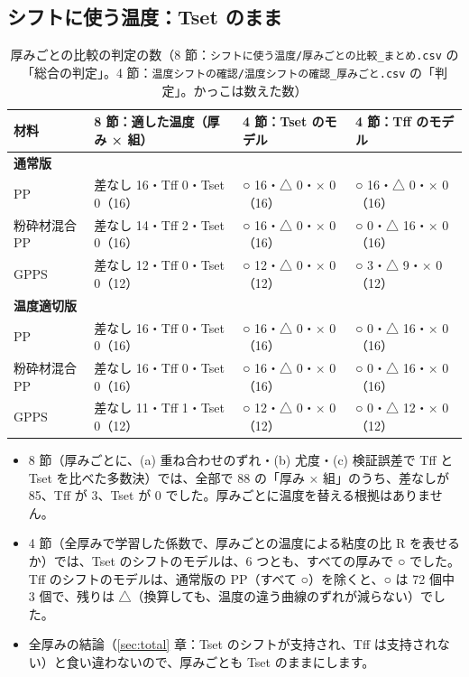 \documentclass[paper=a4paper,fontsize=10.5pt,line_length=44zw,number_of_lines=40]{jlreq}
\let\origtextbf\textbf
\renewcommand{\textbf}[1]{\origtextbf{\gtfamily #1}}   %
\begin{document}
\subsection{シフトに使う温度：Tset のまま}
\begin{table}[H]\centering\small
\caption{厚みごとの比較の判定の数（8 節：\texttt{シフトに使う温度/\allowbreak{}厚みごとの比較\_\allowbreak{}まとめ.csv} の「総合の判定」。4 節：\texttt{温度シフトの確認/\allowbreak{}温度シフトの確認\_\allowbreak{}厚みごと.csv} の「判定」。かっこは数えた数）}\label{tab:temp}
\begin{tabular}{llll}
\toprule
材料 & 8 節：適した温度（厚み × 組） & 4 節：Tset のモデル & 4 節：Tff のモデル \\
\midrule
\multicolumn{4}{l}{\textbf{通常版}} \\
PP & 差なし 16・Tff 0・Tset 0（16） & ○ 16・△ 0・× 0（16） & ○ 16・△ 0・× 0（16） \\
粉砕材混合 PP & 差なし 14・Tff 2・Tset 0（16） & ○ 16・△ 0・× 0（16） & ○ 0・△ 16・× 0（16） \\
GPPS & 差なし 12・Tff 0・Tset 0（12） & ○ 12・△ 0・× 0（12） & ○ 3・△ 9・× 0（12） \\
\midrule
\multicolumn{4}{l}{\textbf{温度適切版}} \\
PP & 差なし 16・Tff 0・Tset 0（16） & ○ 16・△ 0・× 0（16） & ○ 0・△ 16・× 0（16） \\
粉砕材混合 PP & 差なし 16・Tff 0・Tset 0（16） & ○ 16・△ 0・× 0（16） & ○ 0・△ 16・× 0（16） \\
GPPS & 差なし 11・Tff 1・Tset 0（12） & ○ 12・△ 0・× 0（12） & ○ 0・△ 12・× 0（12） \\
\bottomrule
\end{tabular}
\end{table}
\begin{itemize}[itemsep=0.3ex,topsep=0.4ex]
\item 8 節（厚みごとに、(a) 重ね合わせのずれ・(b) 尤度・(c) 検証誤差で Tff と Tset を比べた多数決）では、全部で 88 の「厚み × 組」のうち、差なしが 85、Tff が 3、Tset が 0 でした。厚みごとに温度を替える根拠はありません。
\item 4 節（全厚みで学習した係数で、厚みごとの温度による粘度の比 R を表せるか）では、Tset のシフトのモデルは、6 つとも、すべての厚みで ○ でした。Tff のシフトのモデルは、通常版の PP（すべて ○）を除くと、○ は 72 個中 3 個で、残りは △（換算しても、温度の違う曲線のずれが減らない）でした。
\item 全厚みの結論（\ref{sec:total} 章：Tset のシフトが支持され、Tff は支持されない）と食い違わないので、厚みごとも Tset のままにします。
\end{itemize}
\end{document}
